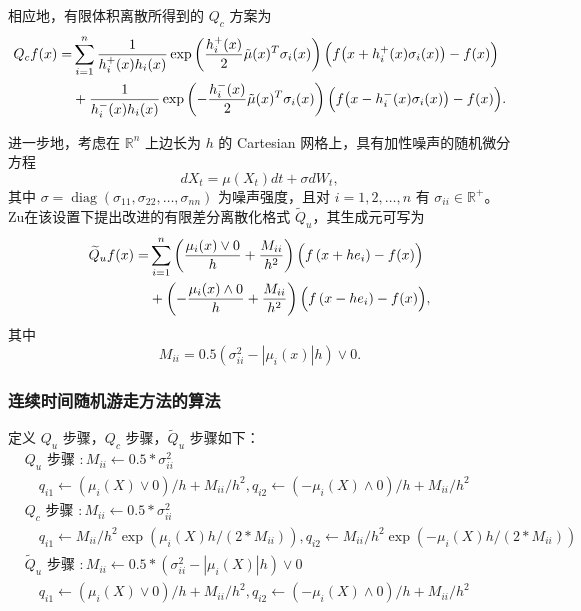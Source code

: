 相应地，有限体积离散所得到的 $Q_c$ 方案为
\begin{align}\label{algorithm:Q_c_rewrite}
	Q_{c} f(x)= & \sum_{i=1}^{n} \frac{1}{h_{i}^{+}(x) h_{i}(x)}
	\exp \left(\frac{h_{i}^{+}(x)}{2} \tilde{\mu}(x)^{T} \sigma_{i}(x)\right)
	\Bigl(f\bigl(x+h_{i}^{+}(x) \sigma_{i}(x)\bigr)-f(x)\Bigr) \notag \\
	& +\frac{1}{h_{i}^{-}(x) h_{i}(x)}
	\exp \left(-\frac{h_{i}^{-}(x)}{2} \tilde{\mu}(x)^{T} \sigma_{i}(x)\right)
	\Bigl(f\bigl(x-h_{i}^{-}(x) \sigma_{i}(x)\bigr)-f(x)\Bigr).
\end{align}

进一步地，考虑在 $\mathbb{R}^n$ 上边长为 $h$ 的 Cartesian 网格上，具有加性噪声的随机微分方程
\[
d X_{t}=\mu\left(X_{t}\right) d t+\sigma d W_{t},
\]
其中 $\sigma=\operatorname{diag}(\sigma_{11},\sigma_{22},\ldots,\sigma_{nn})$ 为噪声强度，且对 $i=1,2,\ldots,n$ 有 $\sigma_{ii}\in\mathbb{R}^+$。Zu\cite{zu2023random}在该设置下提出改进的有限差分离散化格式 $\widetilde{Q}_u$，其生成元可写为
\begin{align}\label{algorithm:Q_u_tilde_rewrite}
	\widetilde{Q}_{u} f(x)= & \sum_{i=1}^{n}\left(\frac{\mu_{i}(x) \vee 0}{h}+\frac{M_{i i}}{h^{2}}\right)\Bigl(f\left(x+h e_{i}\right)-f(x)\Bigr) \notag \\
	& +\left(-\frac{\mu_{i}(x) \wedge 0}{h}+\frac{M_{i i}}{h^{2}}\right)\Bigl(f\left(x-h e_{i}\right)-f(x)\Bigr),
\end{align}
其中
\[
M_{ii}=0.5\left(\sigma_{ii}^{2}-\left|\mu_{i}(x)\right| h\right)\vee 0.
\]

	 \subsubsection{连续时间随机游走方法的算法}
	 
	 定义 $Q_{u}$ 步骤，$Q_{c}$ 步骤，$\tilde{Q}_u$ 步骤如下：
	 \begin{align*}
	 	& Q_{u} \text { 步骤 }: M_{i i} \leftarrow 0.5 * \sigma_{i i}^{2} \\
	 	& \quad q_{i 1} \leftarrow\left(\mu_{i}(X) \vee 0\right) / h+M_{i i} / h^{2}, q_{i 2} \leftarrow\left(-\mu_{i}(X) \wedge 0\right) / h+M_{i i} / h^{2}  \\
	 	& Q_{c} \text { 步骤 }: M_{i i} \leftarrow 0.5 * \sigma_{i i}^{2} \\
	 	& \quad q_{i 1} \leftarrow M_{i i} / h^{2} \exp \left(\mu_{i}(X) h /\left(2 * M_{i i}\right)\right), q_{i 2} \leftarrow M_{i i} / h^{2} \exp \left(-\mu_{i}(X) h /\left(2 * M_{i i}\right)\right) \\
	 	& \widetilde{Q}_{u} \text { 步骤 }: M_{i i} \leftarrow 0.5 *\left(\sigma_{i i}^{2}-\left|\mu_{i}(X)\right| h\right) \vee 0   \\
	 	& \quad q_{i 1} \leftarrow\left(\mu_{i}(X) \vee 0\right) / h+M_{i i} / h^{2}, q_{i 2} \leftarrow\left(-\mu_{i}(X) \wedge 0\right) / h+M_{i i} / h^{2} 
	 \end{align*}
	
